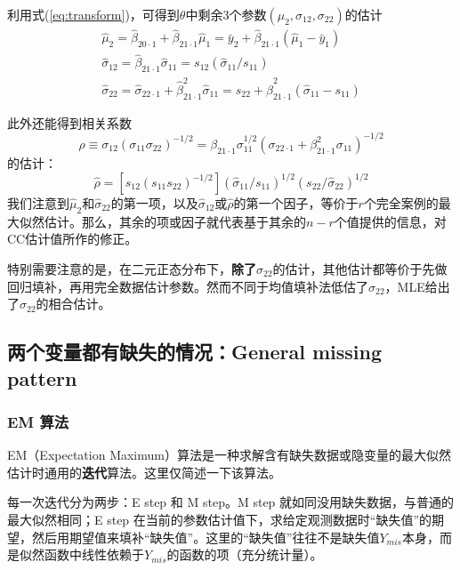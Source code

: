 \documentclass[aps,pre,12pt,preprint,onecolumn,showpacs,showkeys,AutoFakeBold]{revtex4-1}
\begin{document}
    利用式(\ref{eq:transform})，可得到$\theta$中剩余3个参数$(\mu _2, \sigma _{12}, \sigma _{22})$的估计
    \begin{eqnarray}
        \hat \mu _2=\hat \beta _{20\cdot 1}+\hat \beta _{21\cdot 1} \hat \mu _1=\bar y_2 +\hat \beta _{21\cdot 1}(\hat \mu _1 - \bar y_1) \\
        \hat \sigma _{12}=\hat \beta_{21\cdot 1}\hat \sigma _{11}=s_{12} (\hat \sigma _{11}/s_{11}) \\
        \hat \sigma _{22} = \hat \sigma _{22\cdot 1} + \hat \beta _{21 \cdot 1}^2 \hat \sigma _{11}=s_{22}+\hat \beta _{21 \cdot 1}^2(\hat \sigma _{11}-s_{11})
    \end{eqnarray}

    此外还能得到相关系数
    \begin{equation}
        \rho \equiv \sigma _{12} (\sigma _{11} \sigma _{22})^{-1/2}=\beta _{21\cdot 1} \sigma _{11}^{1/2}(\sigma _{22\cdot 1}+\beta _{21\cdot 1}^2 \sigma _{11})^{-1/2}
    \end{equation}
    的估计：
    \begin{equation}
        \hat \rho = [s_{12}(s_{11}s_{22})^{-1/2}](\hat \sigma _{11}/s_{11})^{1/2}(s_{22}/\hat \sigma _{22})^{1/2}
    \end{equation}
    我们注意到$\hat \mu _2$和$\hat \sigma _{22}$的第一项，以及$\hat \sigma _{12}$或$\hat \rho$的第一个因子，等价于$r$个完全案例的最大似然估计。那么，其余的项或因子就代表基于其余的$n-r$个值提供的信息，对CC估计值所作的修正。
    
    特别需要注意的是，在二元正态分布下，\textbf{除了$\hat \sigma _{22}$}的估计，其他估计都等价于先做回归填补，再用完全数据估计参数。然而不同于均值填补法低估了$\sigma _{22}$，MLE给出了$\sigma _{22}$的相合估计。

    \subsection{两个变量都有缺失的情况：General missing pattern}
        \subsubsection{EM 算法}\label{sec:EM}
        EM（Expectation Maximum）算法是一种求解含有缺失数据或隐变量的最大似然估计时通用的\textbf{迭代}算法。这里仅简述一下该算法。
        
        每一次迭代分为两步：E step 和 M step。M step 就如同没用缺失数据，与普通的最大似然相同；E step 在当前的参数估计值下，求给定观测数据时“缺失值”的期望，然后用期望值来填补“缺失值”。这里的“缺失值”往往不是缺失值$Y_{mis}$本身，而是似然函数中线性依赖于$Y_{mis}$的函数的项（充分统计量）。
\end{document}
